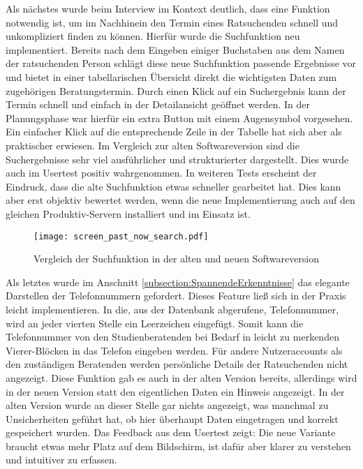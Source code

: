 Als nächstes wurde beim Interview im Kontext deutlich, dass eine Funktion
notwendig ist, um im Nachhinein den Termin eines Ratsuchenden schnell und
unkompliziert finden zu können. Hierfür wurde die Suchfunktion neu
implementiert. Bereits nach dem Eingeben einiger Buchstaben aus dem Namen der
ratsuchenden Person schlägt diese neue Suchfunktion passende Ergebnisse vor und
bietet in einer tabellarischen Übersicht direkt die wichtigsten Daten zum
zugehörigen Beratungstermin. Durch einen Klick auf ein Suchergebnis kann der
Termin schnell und einfach in der Detailansicht geöffnet werden. In der
Planungsphase war hierfür ein extra Button mit einem Augensymbol vorgesehen.
Ein einfacher Klick auf die entsprechende Zeile in der Tabelle hat sich aber
als praktischer erwiesen. Im Vergleich zur alten Softwareversion sind die
Suchergebnisse sehr viel ausführlicher und strukturierter dargestellt. Dies
wurde auch im Usertest positiv wahrgenommen. In weiteren Tests erscheint der
Eindruck, dass die alte Suchfunktion etwas schneller gearbeitet hat. Dies kann
aber erst objektiv bewertet werden, wenn die neue Implementierung auch auf den
gleichen Produktiv-Servern installiert und im Einsatz ist.

\begin{figure}[H]
    \caption{Vergleich der Suchfunktion in der alten und neuen Softwareversion}
    \centering
    \texttt{[image: screen\_past\_now\_search.pdf]}
\end{figure}

Als letztes wurde im Anschnitt \ref{subsection:SpannendeErkenntnisse} das
elegante Darstellen der Telefonnummern gefordert. Dieses Feature ließ sich in
der Praxis leicht implementieren. In die, aus der Datenbank abgerufene,
Telefonnummer, wird an jeder vierten Stelle ein Leerzeichen eingefügt. Somit
kann die Telefonnummer von den Studienberatenden bei Bedarf in leicht zu
merkenden Vierer-Blöcken in das Telefon eingeben werden. Für andere
Nutzeraccounts als den zuständigen Beratenden werden persönliche Details der
Ratsuchenden nicht angezeigt. Diese Funktion gab es auch in der alten Version
bereits, allerdings wird in der neuen Version statt den eigentlichen Daten ein
Hinweis angezeigt. In der alten Version wurde an dieser Stelle gar nichts
angezeigt, was manchmal zu Unsicherheiten geführt hat, ob hier überhaupt Daten
eingetragen und korrekt gespeichert wurden. Das Feedback aus dem Usertest
zeigt: Die neue Variante braucht etwas mehr Platz auf dem Bildschirm, ist dafür
aber klarer zu verstehen und intuitiver zu erfassen.

